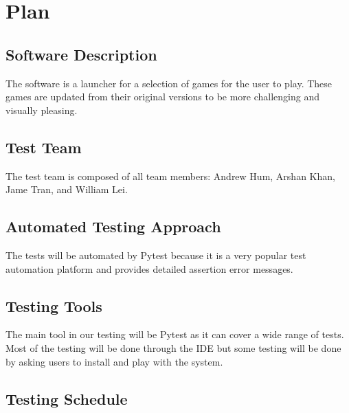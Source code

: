 \documentclass[12pt, titlepage]{article}
\begin{document}
\section{Plan}
	
\subsection{Software Description}

The software is a launcher for a selection of games for the user to play. These games are updated from their original versions to be more challenging and visually pleasing.

\subsection{Test Team}

The test team is composed of all team members: Andrew Hum, Arshan Khan, Jame Tran, and William Lei.

\subsection{Automated Testing Approach}

The tests will be automated by Pytest because it is a very popular test automation platform and provides detailed assertion error messages.

\subsection{Testing Tools}
The main tool in our testing will be Pytest as it can cover a wide range of tests. Most of the testing will be done through the IDE but some testing will be done by asking users to install and play with the system.

\subsection{Testing Schedule}
		
\end{document}
